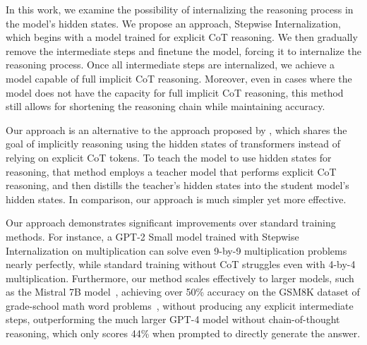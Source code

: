 \documentclass{article}
\begin{document}
In this work, we examine the possibility of internalizing the reasoning process in the model's hidden states. We propose an approach, Stepwise Internalization, which begins with a model trained for explicit CoT reasoning. We then gradually remove the intermediate steps and finetune the model, forcing it to internalize the reasoning process. Once all intermediate steps are internalized, we achieve a model capable of full implicit CoT reasoning. Moreover, even in cases where the model does not have the capacity for full implicit CoT reasoning, this method still allows for shortening the reasoning chain while maintaining accuracy.

Our approach is an alternative to the approach proposed by \citet{deng2023implicit}, which shares the goal of implicitly reasoning using the hidden states of transformers instead of relying on explicit CoT tokens. To teach the model to use hidden states for reasoning, that method employs a teacher model that performs explicit CoT reasoning, and then distills the teacher's hidden states into the student model's hidden states. In comparison, our approach is much simpler yet more effective. %


Our approach demonstrates significant improvements over standard training methods. For instance, a GPT-2 Small model trained with Stepwise Internalization on multiplication can solve even 9-by-9 multiplication problems nearly perfectly, while standard training without CoT struggles even with 4-by-4 multiplication. Furthermore, our method scales effectively to larger models, such as the Mistral 7B model~\citep{jiang2023mistral}, achieving over 50\% accuracy on the GSM8K dataset of grade-school math word problems~\citep{cobbe2021training}, without producing any explicit intermediate steps, outperforming the much larger GPT-4 model without chain-of-thought reasoning, which only scores 44\% when prompted to directly generate the answer.
\end{document}
